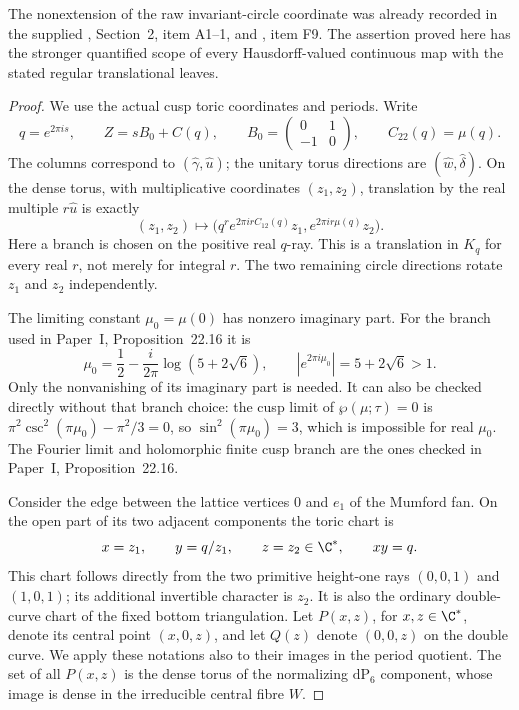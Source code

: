 The nonextension of the raw invariant-circle coordinate was already
recorded in the supplied ,
Section~2, item A1--1, and
, item F9.
The assertion proved here has the stronger quantified scope of every
Hausdorff-valued continuous map with the stated regular translational
leaves. 
\begin{proof}
We use the actual cusp toric coordinates and periods. Write
\[
 q=e^{2\pi i s},\qquad
 Z=sB_0+C(q),\qquad
 B_0=\begin{pmatrix}0&1\\-1&0\end{pmatrix},
 \qquad C_{22}(q)=\mu(q).
\]
The columns correspond to $(\widehat\gamma,\widehat u)$;
the unitary torus directions are $(\widehat w,\widehat\delta)$.
On the dense torus, with multiplicative coordinates $(z_1,z_2)$,
translation by the real multiple $r\widehat u$ is exactly
\begin{equation}\label{push:eq:C12-u-flow}
 (z_1,z_2)\longmapsto
 \bigl(q^r e^{2\pi i r C_{12}(q)}z_1,
             e^{2\pi i r\mu(q)}z_2\bigr).
\end{equation}
Here a branch is chosen on the positive real $q$-ray. This is a
translation in $K_q$ for every real $r$, not merely for integral $r$.
The two remaining circle directions rotate $z_1$ and $z_2$
independently.

The limiting constant $\mu_0=\mu(0)$ has nonzero imaginary part.
For the branch used in Paper~I, Proposition~22.16 it is
\[
 \mu_0=\frac12-\frac{i}{2\pi}\log(5+2\sqrt6),\qquad
 |e^{2\pi i\mu_0}|=5+2\sqrt6>1.
\]
Only the nonvanishing of its imaginary part is needed. It can
also be checked directly without that branch choice: the cusp
limit of $\wp(\mu;\tau)=0$ is
$\pi^2\csc^2(\pi\mu_0)-\pi^2/3=0$, so
$\sin^2(\pi\mu_0)=3$, which is impossible for real $\mu_0$.
The Fourier limit and holomorphic finite cusp branch are the
ones checked in Paper~I, Proposition~22.16.

Consider the edge between the lattice vertices $0$ and $e_1$
of the Mumford fan. On the open part of its two adjacent
components the toric chart is
\[
 x=z_1,\qquad y=q/z_1,\qquad z=z_2\in\C^*,
 \qquad xy=q.
\]
This chart follows directly from the two primitive height-one
rays $(0,0,1)$ and $(1,0,1)$; its additional invertible character
is $z_2$. It is also the ordinary double-curve chart of the
fixed bottom triangulation. Let $P(x,z)$, for $x,z\in\C^*$,
denote its central point $(x,0,z)$, and let $Q(z)$ denote
$(0,0,z)$ on the double curve. We apply these notations also
to their images in the period quotient. The set of all $P(x,z)$
is the dense torus of the normalizing $\mathrm{dP}_6$ component,
whose image is dense in the irreducible central fibre $W$.


\end{proof}
